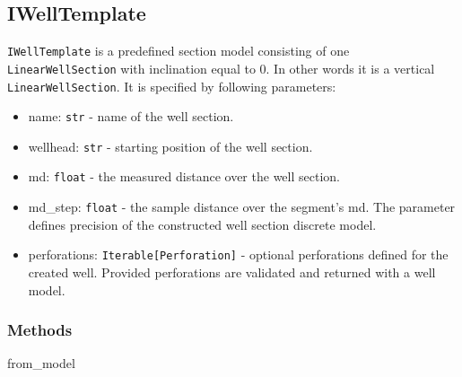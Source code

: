 \documentclass[english,10pt,a4paper]{article}
\begin{document}
	\newpage
	\subsection{IWellTemplate}
	\texttt{IWellTemplate} is a predefined section model consisting of one \texttt{LinearWellSection} with inclination equal to 0. In other words it is a vertical \texttt{LinearWellSection}. It is specified by following parameters:
	\begin{itemize}
		\item  \colorbox{gray!20}{name:} \texttt{str} - name of the well section.
		\item  \colorbox{gray!20}{wellhead:} \texttt{str} - starting position of the well section.
		\item  \colorbox{gray!20}{md:} \texttt{float} - the measured distance over the well section.
		\item  \colorbox{gray!20}{md\_step:} \texttt{float} - the sample distance over the segment's md. The parameter defines precision of the constructed well section discrete model.
		\item  \colorbox{gray!20}{perforations:} \texttt{Iterable[Perforation]} - optional perforations defined for the created well. Provided perforations are validated and returned with a well model.
	\end{itemize}
	\subsubsection{Methods}
	\begin{description}
		\item[\colorbox{gray!20}{from\_model}] \hfill
	\end{description}
\end{document}
